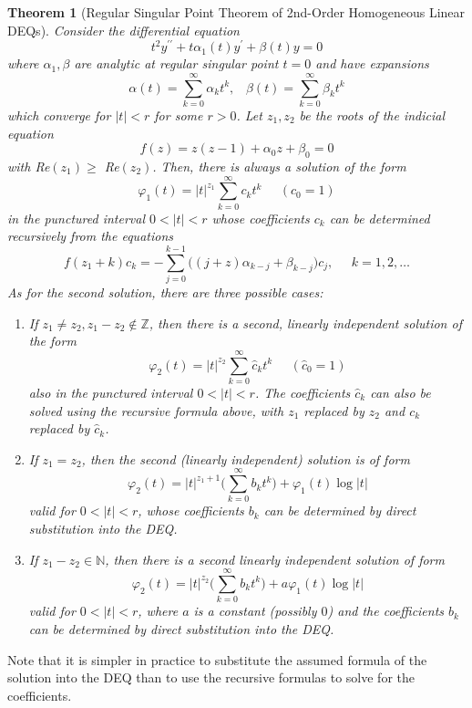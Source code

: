 \documentclass{article}
\newtheorem{theorem}{Theorem}[section]
\theoremstyle{remark}
\theoremstyle{definition}
\begin{document}
      \begin{theorem}[Regular Singular Point Theorem of 2nd-Order Homogeneous Linear DEQs]
      Consider the differential equation
      \[t^2 y^{\prime\prime} + t \alpha_1 (t) y^\prime + \beta (t) y = 0\]
      where $\alpha_1, \beta$ are analytic at regular singular point $t = 0$ and have expansions
      \[\alpha (t) = \sum_{k=0}^\infty \alpha_k t^k, \;\;\; \beta(t) = \sum_{k=0}^\infty \beta_k t^k\]
      which converge for $|t|<r$ for some $r>0$. Let $z_1, z_2$ be the roots of the indicial equation
      \[f(z) = z(z-1) + \alpha_0 z + \beta_0 = 0\]
      with Re$(z_1) \geq$ Re$(z_2)$. Then, there is always a solution of the form 
      \[\varphi_1 (t) = |t|^{z_1} \sum_{k=0}^\infty c_k t^k \;\;\;\;\; (c_0 = 1)\]
      in the punctured interval $0<|t|<r$ whose coefficients $c_k$ can be determined recursively from the equations
      \[f(z_1 + k) c_k = - \sum_{j=0}^{k-1} \big((j+z)\alpha_{k-j} + \beta_{k-j}\big) c_j, \;\;\;\;\; k = 1, 2, \ldots\]
      As for the second solution, there are three possible cases: 
      \begin{enumerate}
          \item If $z_1 \neq z_2, z_1 - z_2 \not\in \mathbb{Z}$, then there is a second, linearly independent solution of the form 
          \[\varphi_2 (t) = |t|^{z_2} \sum_{k=0}^\infty \hat{c}_k t^k \;\;\;\;\; (\hat{c}_0 = 1)\]
          also in the punctured interval $0 < |t| < r$. The coefficients $\hat{c}_k$ can also be solved using the recursive formula above, with $z_1$ replaced by $z_2$ and $c_k$ replaced by $\hat{c}_k$. 
          \item If $z_1 = z_2$, then the second (linearly independent) solution is of form
          \[\varphi_2 (t) = |t|^{z_1 + 1} \bigg( \sum_{k=0}^\infty b_k t^k\bigg) + \varphi_1 (t) \log{|t|}\]
          valid for $0<|t|<r$, whose coefficients $b_k$ can be determined by direct substitution into the DEQ. 
          \item If $z_1 - z_2 \in \mathbb{N}$, then there is a second linearly independent solution of form 
          \[\varphi_2 (t) = |t|^{z_2} \bigg( \sum_{k=0}^\infty b_k t^k \bigg) + a \varphi_1 (t) \log{|t|}\]
          valid for $0<|t|<r$, where $a$ is a constant (possibly $0$) and the coefficients $b_k$ can be determined by direct substitution into the DEQ. 
      \end{enumerate}
      \end{theorem}

      Note that it is simpler in practice to substitute the assumed formula of the solution into the DEQ than to use the recursive formulas to solve for the coefficients. 
\end{document}
